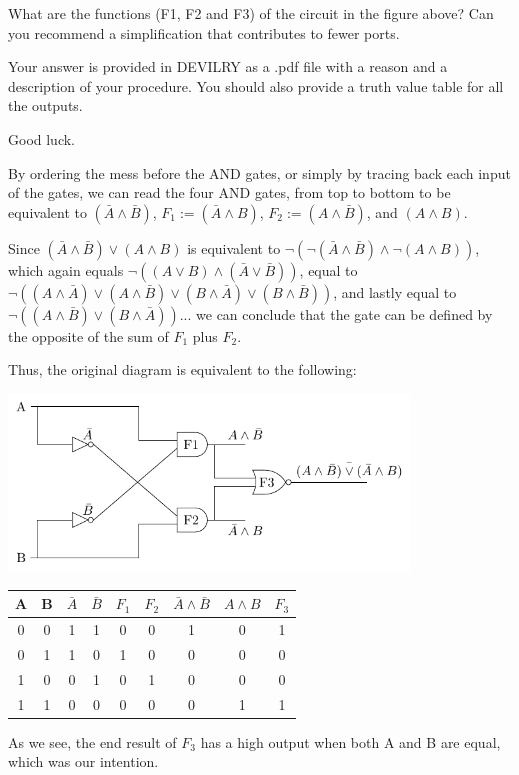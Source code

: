 \documentclass[table]{myassignment}
\begin{document}
	\begin{problem}
		What are the functions (F1, F2 and F3) of the circuit in the figure above? Can you recommend a simplification that contributes to fewer ports.

		Your answer is provided in DEVILRY as a .pdf file with a reason and a description of your procedure. You should also provide a truth value table for all the outputs.
 
		Good luck.
	\end{problem}

	\begin{answer}
		By ordering the mess before the AND gates, or simply by tracing back each input of the gates, we can read the four AND gates, from top to bottom to be equivalent to $(\bar{A}\land\bar{B})$, $F_1:=(\bar{A}\land{B})$, $F_2:=({A}\land\bar{B})$, and $({A}\land{B})$. 

		Since $(\bar{A}\land\bar{B}) \lor ({A}\land{B})$ is equivalent to $\neg(\neg(\bar{A}\land\bar{B}) \land \neg({A}\land{B}))$, which again equals $\neg(({A}\lor{B}) \land (\bar{A}\lor\bar{B}))$, equal to $\neg((A\land\bar{A})\lor(A\land\bar{B})\lor(B\land\bar{A})\lor(B\land\bar{B}))$, and lastly equal to $\neg((A\land\bar{B})\lor(B\land\bar{A}))$... we can conclude that the gate can be defined by the opposite of the sum of $F_1$ plus $F_2$.

		Thus, the original diagram is equivalent to the following:
		\begin{center}
			\includegraphics[width=0.8\textwidth]{reduced_circuit.pdf}
		\end{center}
	\end{answer}
	\begin{answer}
	\begin{center}
		\begin{tabular}{|c|c|c|c|c|c|c|c|c|}
			\hline
			A & B & $\bar{A}$ & $\bar{B}$ & $F_1$ & $F_2$ & $\bar{A}\land\bar{B}$ & $A\land B$ & $F_3$ \\
			\hline
			0 & 0 & 1 & 1 &  0 & 0 & 1 & 0 & 1 \\ 
			0 & 1 & 1 & 0 & 1 & 0 & 0 & 0 & 0 \\
			1 & 0 & 0 & 1 & 0 & 1 & 0 & 0 & 0 \\
			1 & 1 & 0 & 0 & 0 & 0 & 0 & 1 & 1 \\
			 \hline
		\end{tabular}
	\end{center}
		As we see, the end result of $F_3$ has a high output when both A and B are equal, which was our intention.

	\end{answer}
\end{document}
